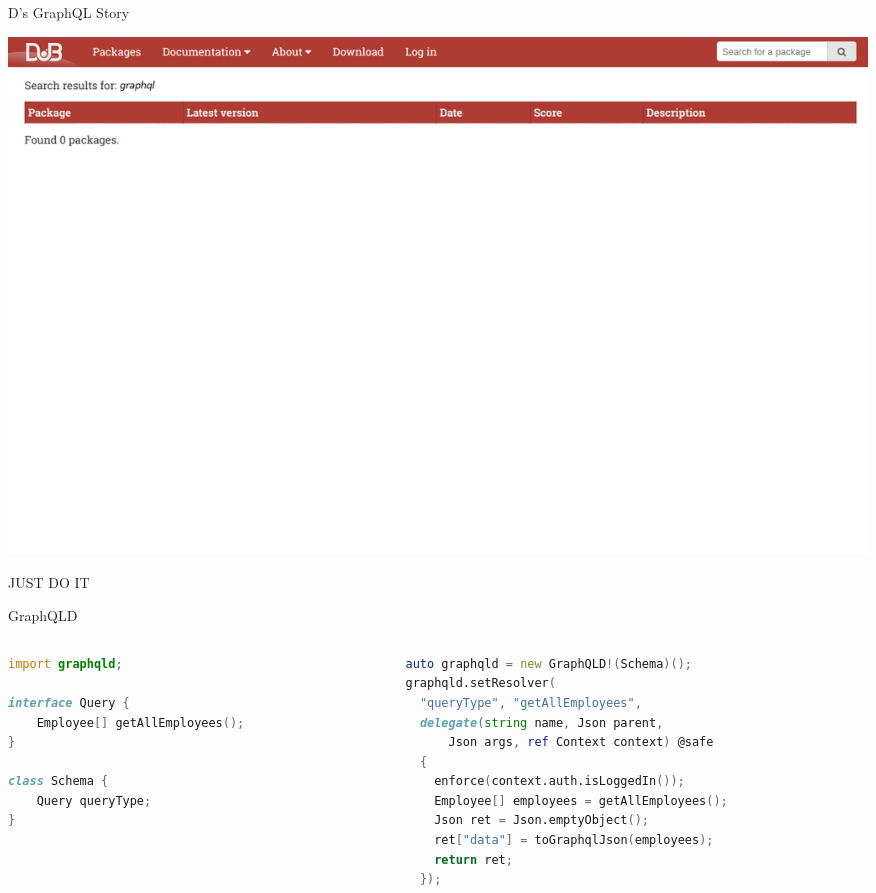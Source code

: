 \documentclass[aspectratio=169,notes]{beamer}
\begin{document}
	\begin{frame}[fragile]{D's GraphQL Story}
		\begin{center}
			\includegraphics{graphqlsearch.jpg}	
		\end{center}	
	\end{frame}

	\begin{frame}{JUST DO IT}
		\begin{center}
		\end{center}
	\end{frame}

	\begin{frame}[fragile]{GraphQLD}
		\begin{columns}[t]
			\begin{column}{0.4\textwidth}
\begin{lstlisting}[language=D,basicstyle=\scriptsize\ttfamily]
import graphqld;

interface Query {
	Employee[] getAllEmployees();
}

class Schema {
	Query queryType;
}
\end{lstlisting}
			\end{column}
	\pause
			\begin{column}{0.6\textwidth}
\begin{lstlisting}[language=D,basicstyle=\scriptsize\ttfamily]
auto graphqld = new GraphQLD!(Schema)();
graphqld.setResolver(
  "queryType", "getAllEmployees",
  delegate(string name, Json parent, 
      Json args, ref Context context) @safe
  {
    enforce(context.auth.isLoggedIn());
    Employee[] employees = getAllEmployees();
    Json ret = Json.emptyObject();
    ret["data"] = toGraphqlJson(employees);
    return ret;
  });
\end{lstlisting}
			\end{column}
		\end{columns}
	\end{frame}
\end{document}
